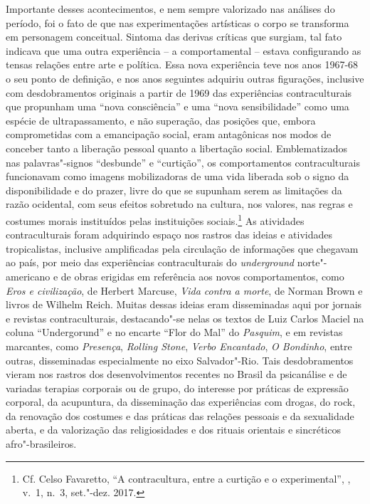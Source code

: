 Importante desses acontecimentos, e nem sempre valorizado nas análises
do período, foi o fato de que nas experimentações artísticas o corpo se
transforma em personagem conceitual. Sintoma das derivas críticas que
surgiam, tal fato indicava que uma outra experiência -- a comportamental
-- estava configurando as tensas relações entre arte e política. Essa
nova experiência teve nos anos 1967-68 o seu ponto de definição, e nos
anos seguintes adquiriu outras figurações, inclusive com desdobramentos
originais a partir de 1969 das experiências contraculturais que
propunham uma ``nova consciência'' e uma ``nova sensibilidade'' como uma
espécie de ultrapassamento, e não superação, das posições que, embora
comprometidas com a emancipação social, eram antagônicas nos modos de
conceber tanto a liberação pessoal quanto a libertação social.
Emblematizados nas palavras"-signos ``desbunde'' e ``curtição'', os
comportamentos contraculturais funcionavam como imagens mobilizadoras de
uma vida liberada sob o signo da disponibilidade e do prazer, livre do
que se supunham serem as limitações da razão ocidental, com seus efeitos
sobretudo na cultura, nos valores, nas regras e costumes morais
instituídos pelas instituições sociais.\footnote{Cf. Celso Favaretto,
  ``A contracultura, entre a curtição e o experimental'', {}, v.~1, n.~3, set."-dez. 2017.} As
atividades contraculturais foram adquirindo espaço nos rastros das
ideias e atividades tropicalistas, inclusive amplificadas pela
circulação de informações que chegavam ao país, por meio das
experiências contraculturais do \emph{underground} norte"-americano e de
obras erigidas em referência aos novos comportamentos, como \emph{Eros e
civilização}, de Herbert Marcuse, \emph{Vida contra a morte}, de Norman
Brown e livros de Wilhelm Reich. Muitas dessas ideias eram disseminadas
aqui por jornais e revistas contraculturais, destacando"-se nelas os
textos de Luiz Carlos Maciel na coluna ``Undergorund'' e no encarte
``Flor do Mal'' do \emph{Pasquim}, e em revistas marcantes, como
\emph{Presença}, \emph{Rolling Stone}, \emph{Verbo Encantado},
\emph{O Bondinho}, entre outras, disseminadas especialmente no eixo
Salvador"-Rio. Tais desdobramentos vieram nos rastros dos
desenvolvimentos recentes no Brasil da psicanálise e de variadas
terapias corporais ou de grupo, do interesse por práticas de expressão
corporal, da acupuntura, da disseminação das experiências com drogas, do
rock, da renovação dos costumes e das práticas das relações pessoais e
da sexualidade aberta, e da valorização das religiosidades e dos rituais
orientais e sincréticos afro"-brasileiros.

